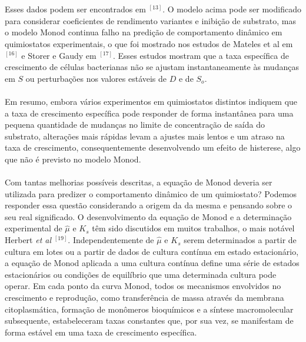 \documentclass{article}
\begin{document}
\\\\Esses dados podem ser encontrados em $^{[13]}$. O modelo acima pode ser modificado para considerar coeficientes de rendimento variantes e inibição de substrato, mas o modelo Monod continua falho na predição de comportamento dinâmico em quimiostatos experimentais, o que foi mostrado nos estudos de Mateles et al em $^{[16]}$ e Storer e Gaudy em $^{[17]}$. Esses estudos mostram que a taxa específica de crescimento de células bacterianas não se ajustam instantaneamente às mudanças em $S$ ou perturbações nos valores estáveis de $D$ e de $S_o$.
\\\\Em resumo, embora vários experimentos em quimiostatos distintos indiquem que a taxa de crescimento específica pode responder de forma instantânea para uma pequena quantidade de mudanças no limite de concentração de saída do substrato, alterações mais rápidas levam a ajustes mais lentos e um atraso na taxa de crescimento, consequentemente desenvolvendo um efeito de histerese, algo que não é previsto no modelo Monod.
\\\\Com tantas melhorias possíveis descritas, a equação de Monod deveria ser utilizada para predizer o comportamento dinâmico de um quimiostato? Podemos responder essa questão considerando a origem da da mesma e pensando sobre o seu real significado. O desenvolvimento da equação de Monod e a determinação experimental de $\hat{\mu}$ e $K_s$ têm sido discutidos em muitos trabalhos, o mais notável Herbert \textit{et al} $^{[19]}$. Independentemente de $\hat{\mu}$ e $K_s$ serem determinados a partir de cultura em lotes ou a partir de dados de cultura contínua em estado estacionário, a equação de Monod aplicada a uma cultura contínua define uma série de estados estacionários ou condições de equilíbrio que uma determinada cultura pode operar. Em cada ponto da curva Monod, todos os mecanismos envolvidos no crescimento e reprodução, como transferência de massa através da membrana citoplasmática, formação de monômeros bioquímicos e a síntese macromolecular subsequente, estabeleceram taxas constantes que, por sua vez, se manifestam de forma estável em uma taxa de crescimento específica. 
\\\\
\end{document}
